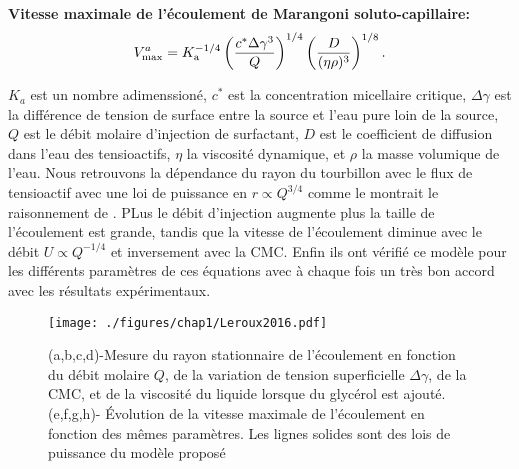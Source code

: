 \begin{ombretheo}
  \begin{theo}
    \noindent \textbf{Vitesse maximale de l'écoulement de Marangoni soluto-capillaire:}\\
  \begin{equation}
  V_{\rm max}^{a}=K_{\rm a}^{-1/4}\left(\frac{c^{*}\Delta\gamma^3}{Q}\right)^{1/4}\left(\frac{D}{(\eta\rho)^3}\right)^{1/8}.
\end{equation}
\end{theo}
\end{ombretheo}
$K_a$ est un nombre adimenssioné, $c^{*}$ est la concentration micellaire critique, $\Delta\gamma$ est la différence de tension de surface entre la source et l'eau pure loin de la source, $Q$ est le débit molaire d'injection de surfactant, $D$ est le coefficient de diffusion dans l'eau des tensioactifs, $\eta$ la viscosité dynamique, et $\rho$ la masse volumique de l'eau. Nous retrouvons la dépendance du rayon du tourbillon avec le flux de tensioactif avec une loi de puissance en $r\propto Q^{3/4}$ comme le montrait le raisonnement de \cite{Roche2014}. PLus le débit d'injection augmente plus la taille de l'écoulement est grande, tandis que la vitesse de l'écoulement diminue avec le débit $U\propto Q^{-1/4}$ et inversement avec la CMC. Enfin ils ont vérifié ce modèle pour les différents paramètres de ces équations avec à chaque fois un très bon accord avec les résultats expérimentaux.

\begin{figure}[!ht]
  \centering
  \texttt{[image: ./figures/chap1/Leroux2016.pdf]}
  \caption{(a,b,c,d)-Mesure du rayon stationnaire de l'écoulement en fonction du débit molaire $Q$, de la variation de tension superficielle $\Delta\gamma$, de la CMC, et de la viscosité du liquide lorsque du glycérol est ajouté. (e,f,g,h)- Évolution de la vitesse maximale de l'écoulement en fonction des mêmes paramètres. Les lignes solides sont des lois de puissance du modèle proposé \cite{Leroux2016}}
  \label{fig:Leroux}
\end{figure}

 

